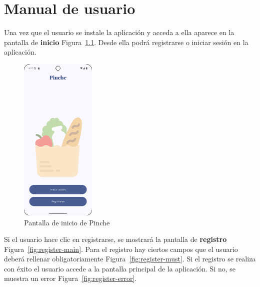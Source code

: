 \cleardoublepage
\appendix
\chapter{Manual de usuario}
\label{app:manual}

Una vez que el usuario se instale la aplicación y acceda a ella aparece en la pantalla de \textbf{inicio} Figura~\ref{fig:start}. Desde ella podrá registrarse o iniciar sesión en la aplicación.

\begin{figure}[H]
\centering
\includegraphics[width=0.32\textwidth]{./img/manual/pinche_first_screen.png}
\caption{Pantalla de inicio de Pinche}
\label{fig:start}
\end{figure}

\clearpage
Si el usuario hace clic en registrarse, se mostrará la pantalla de \textbf{registro} Figura~\ref{fig:register-main}. Para el registro hay ciertos campos que el usuario deberá rellenar obligatoriamente Figura~\ref{fig:register-must}. Si el registro se realiza con éxito el usuario accede a la pantalla principal de la aplicación. Si no, se muestra un error Figura~\ref{fig:register-error}.

